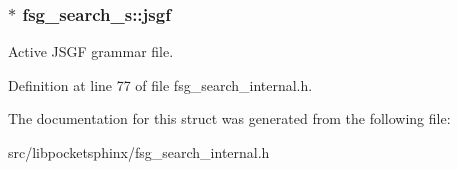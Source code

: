 \subsubsection[{jsgf}]{$\ast$ {\bf fsg\-\_\-search\-\_\-s\-::jsgf}}\label{structfsg__search__s_a5450c5baac34c706d32f26c1cf373ce3}


\-Active \-J\-S\-G\-F grammar file. 



\-Definition at line 77 of file fsg\-\_\-search\-\_\-internal.\-h.



\-The documentation for this struct was generated from the following file\-:\begin{DoxyCompactItemize}
\item 
src/libpocketsphinx/fsg\-\_\-search\-\_\-internal.\-h\end{DoxyCompactItemize}
